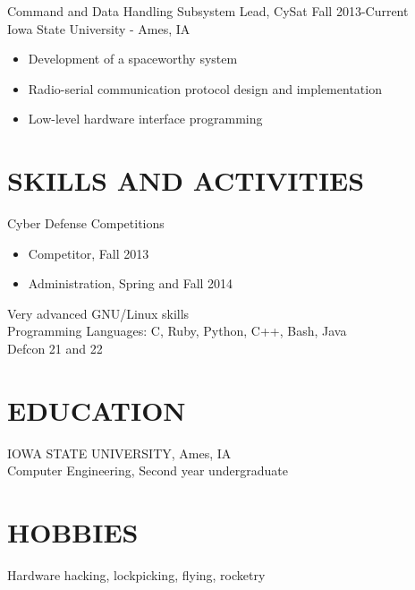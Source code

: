 \documentclass[11pt]{res} %
\begin{document}
\begin{resume}
Command and Data Handling Subsystem Lead, CySat \hfill Fall 2013-Current\\
Iowa State University - Ames, IA
\begin{itemize} \itemsep -2pt
	\item Development of a spaceworthy system
	\item Radio-serial communication protocol design and implementation
	\item Low-level hardware interface programming
	\end{itemize}

\section{SKILLS AND ACTIVITIES} 
Cyber Defense Competitions
	\begin{itemize} \itemsep -2pt 
	\item Competitor, Fall 2013
	\item Administration, Spring and Fall 2014
	\end{itemize}
Very advanced GNU/Linux skills\\
Programming Languages: C, Ruby, Python, C++, Bash, Java\\
Defcon 21 and 22

\section{EDUCATION} 
 \noindent IOWA STATE UNIVERSITY, Ames, IA \\
Computer Engineering, Second year undergraduate
 
\section{HOBBIES} 
Hardware hacking, lockpicking, flying, rocketry

\end{resume}
\end{document}
